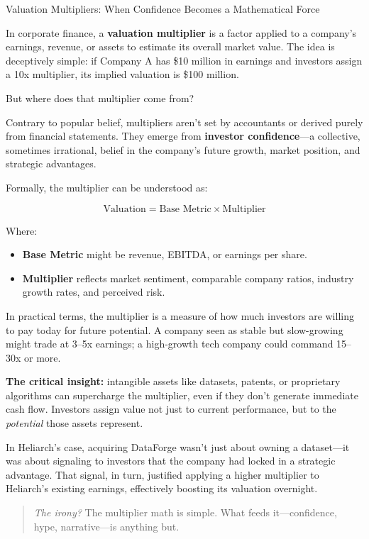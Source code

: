 \begin{HistoricalSidebar}{Valuation Multipliers: When Confidence Becomes a Mathematical Force}

    In corporate finance, a \textbf{valuation multiplier} is a factor applied to a company’s earnings, revenue, or assets to estimate its overall market value. The idea is deceptively simple:  
    if Company A has \$10 million in earnings and investors assign a 10x multiplier, its implied valuation is \$100 million.  
    
    \medskip
    
    But where does that multiplier come from?
    
    \medskip
    
    Contrary to popular belief, multipliers aren’t set by accountants or derived purely from financial statements.  
    They emerge from \textbf{investor confidence}—a collective, sometimes irrational, belief in the company’s future growth, market position, and strategic advantages.
    
    \medskip
    
    Formally, the multiplier can be understood as:
    
    \[
    \text{Valuation} = \text{Base Metric} \times \text{Multiplier}
    \]
    
    Where:
    \begin{itemize}
        \item \textbf{Base Metric} might be revenue, EBITDA, or earnings per share.
        \item \textbf{Multiplier} reflects market sentiment, comparable company ratios, industry growth rates, and perceived risk.
    \end{itemize}
    
    \medskip
    
    In practical terms, the multiplier is a measure of how much investors are willing to pay today for future potential.  
    A company seen as stable but slow-growing might trade at 3--5x earnings; a high-growth tech company could command 15--30x or more.
    
    \medskip
    
    \textbf{The critical insight:} intangible assets like datasets, patents, or proprietary algorithms can supercharge the multiplier, even if they don’t generate immediate cash flow. Investors assign value not just to current performance, but to the \textit{potential} those assets represent.
    
    \medskip
    
    In Heliarch’s case, acquiring DataForge wasn’t just about owning a dataset—it was about signaling to investors that the company had locked in a strategic advantage.  
    That signal, in turn, justified applying a higher multiplier to Heliarch’s existing earnings, effectively boosting its valuation overnight.
    
    \begin{quote}
    \textit{The irony?}  
    The multiplier math is simple.  
    What feeds it—confidence, hype, narrative—is anything but.
    \end{quote}
    
\end{HistoricalSidebar}


